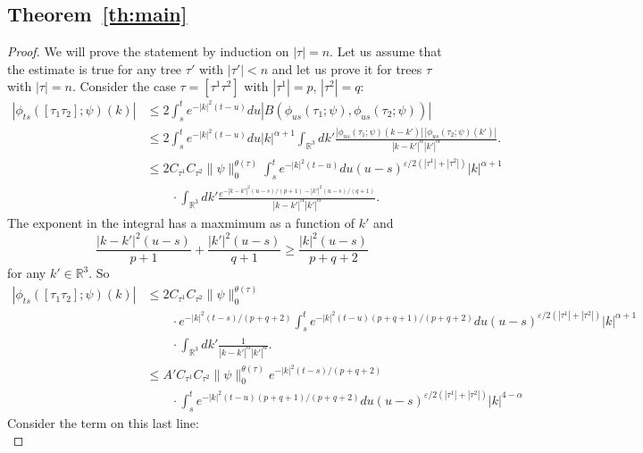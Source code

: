 \documentclass[a4paper,12pt,reqno]{amsart}
\newcommand{\1}{{\bf 1}}
\newcommand{\eps}{\varepsilon}
\newcommand{\RR}{\mathbb{R}}
\begin{document}
\subsection{Theorem~\ref{th:main}}
\begin{proof}
We will prove the statement by induction on $|\tau|= n$. Let us
assume that the estimate is true for any tree $\tau'$ with $|\tau'| <
n$ and let us prove it for trees $\tau$ with $|\tau| = n$. 
Consider the case $\tau = [\tau^1 \tau^2]$ with $|\tau^1| = p$,
$|\tau^2| = q$:
\begin{equation*}
  \begin{split}
\left|\phi_{ts}([\tau_1 \tau_2];\psi)(k)\right|
&  \le 2 \int_s^t e^{-|k|^2 (t-u)} du
|B(\phi_{us}(\tau_1;\psi), \phi_{us}(\tau_2;\psi))|    
\\
&  \le 2 \int_s^t e^{-|k|^2 (t-u)} du
 |k|^{\alpha+1}
\int_{\RR^3}dk' \frac{|\phi_{us}(\tau_1;\psi)(k-k')|\, |\phi_{us}(\tau_2;\psi)(k')|}{|k-k'|^{\alpha} |k'|^{\alpha}}.    
\\
&  \le 2 C_{\tau^1} C_{\tau^2} \|\psi\|_0^{\theta(\tau)}
\int_s^t e^{-|k|^2 (t-u)} du (u-s)^{\eps/2 (|\tau^1|+|\tau^2|)}
 |k|^{\alpha+1}
\\ & \qquad \cdot
\int_{\RR^3}dk' \frac{e^{-|k-k'|^2 (u-s) / (p+1)-|k'|^2 (u-s) / (q+1)}}{|k-k'|^{\alpha} |k'|^{\alpha}}.    
  \end{split}
\end{equation*}
The exponent in the integral has a maxmimum as a function of $k'$ and
$$
\frac{|k-k'|^2 (u-s)}{p+1} + \frac{|k'|^2 (u-s)}{q+1}  \ge \frac{|k|^2 (u-s)}{p+q+2} 
$$
for any $k' \in \RR^3$. So
\begin{equation*}
  \begin{split}
\left|\phi_{ts}([\tau_1 \tau_2];\psi)(k)\right|
&   \le 2 C_{\tau^1} C_{\tau^2} \|\psi\|_0^{\theta(\tau)}
\\ & \qquad \cdot
e^{-|k|^2 (t-s)/(p+q+2)} \int_s^t e^{-|k|^2 (t-u) (p+q+1)/(p+q+2)}  du
 (u-s)^{\eps/2 (|\tau^1|+|\tau^2|)} |k|^{\alpha+1}
\\ & \qquad \cdot
\int_{\RR^3}dk' \frac{1}{|k-k'|^{\alpha} |k'|^{\alpha}}.    
\\ &   \le A' C_{\tau^1} C_{\tau^2} \|\psi\|_0^{\theta(\tau)}
e^{-|k|^2 (t-s)/(p+q+2)}
\\ & \qquad \cdot
 \int_s^t e^{-|k|^2 (t-u) (p+q+1)/(p+q+2)}  du
(u-s)^{\eps/2 (|\tau^1|+|\tau^2|)}
 |k|^{4-\alpha}
  \end{split}
\end{equation*}
Consider the term on this last line:
\begin{equation*}

\end{equation*}
\end{proof}
\end{document}
